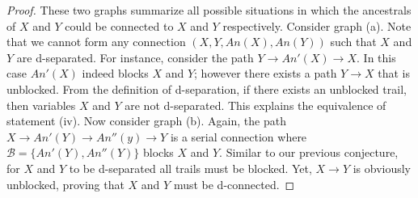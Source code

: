 \documentclass{amsart}
\theoremstyle{plain}
\begin{document}
\begin{proof}
  These two graphs summarize all possible situations in which the ancestrals of $X$ and $Y$ could
  be connected to $X$ and $Y$ respectively. Consider graph (a). Note that we cannot form any
  connection $(X,Y,An(X),An(Y))$ such that $X$ and $Y$ are d-separated. For instance, consider the
  path $Y\rightarrow An'(X)\rightarrow X$. In this case $An'(X)$ indeed blocks $X$ and $Y$; however
  there exists a path $Y\rightarrow X$ that is unblocked. From the definition of d-separation, if
  there exists an unblocked trail, then variables $X$ and $Y$ are not d-separated. This explains
  the equivalence of statement (iv). Now consider graph (b). Again, the path $X\rightarrow An'(Y)
  \rightarrow An''(y)\rightarrow Y$ is a serial connection where $\mathcal{B}=\{An'(Y),An''(Y)\}$
  blocks $X$ and $Y$. Similar to our previous conjecture, for $X$ and $Y$ to be d-separated all
  trails must be blocked. Yet, $X\rightarrow Y$ is obviously unblocked, proving that $X$ and $Y$
  must be d-connected.
\end{proof}
\end{document}
